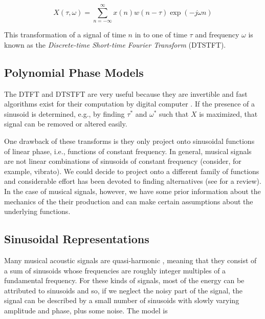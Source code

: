 \begin{equation}
    X(\tau,\omega) = \sum_{n=-\infty}^{\infty} x(n) w(n - \tau) \exp(-j \omega n)
\end{equation}

This transformation of a signal of time $n$ in to one of time $\tau$ and
frequency $\omega$ is known as the \textit{Discrete-time Short-time Fourier
Transform} (DTSTFT).

\begin{samepage}

\section{Polynomial Phase Models\label{sec:polynomphasemodel}}

The DTFT and DTSTFT are very useful because they are invertible
\cite{portnoff1976implementation} and fast algorithms exist for their 
computation by digital computer \cite{van1992computational}. If the presence of
a sinusoid is determined, e.g., by finding $\tau^{\ast}$ and $\omega^{\ast}$ such that
$X$ is maximized, that signal can be removed or altered easily.

One drawback of these transforms is they only project onto sinusoidal functions
of linear phase, i.e., functions of constant frequency. In general, musical
signals are not linear combinations of sinusoids of constant frequency
(consider, for example, vibrato). We could decide to project onto a different
family of functions and considerable effort has been devoted to finding
alternatives (see \cite{kereliuk2011sparse} for a review). In the case of
musical signals, however, we have some prior information about the mechanics of
the their production and can make certain assumptions about the underlying
functions.

\end{samepage}

\subsection{Sinusoidal Representations\label{sec:mqfmfromphase}} Many musical
acoustic signals are quasi-harmonic \cite{fletcher2012physics}, meaning that
they consist of a sum of sinusoids whose frequencies are roughly integer
multiples of a fundamental frequency. For these kinds of signals, most of the
energy can be attributed to sinusoids and so, if we neglect the noisy part of
the signal, the signal can be described by a small number of sinusoids with
slowly varying amplitude and phase, plus some noise. The model is


